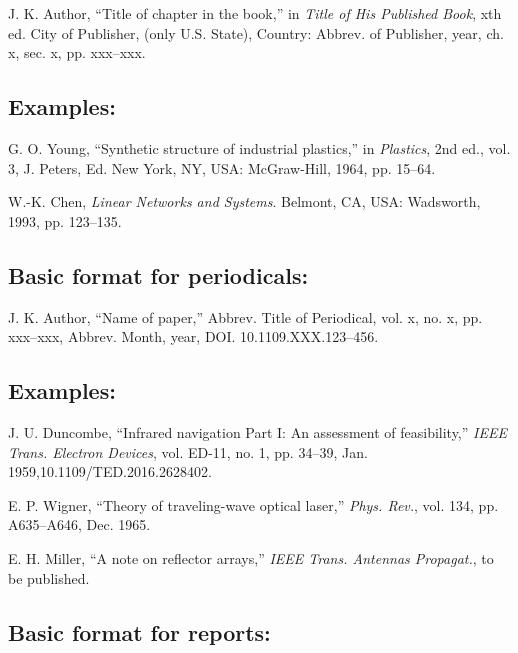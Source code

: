 J. K. Author, ``Title of chapter in the book,'' in {\em Title of His Published Book}, xth ed. City of Publisher, (only U.S. State), Country: Abbrev. of Publisher, year, ch. x, sec. x, pp. xxx--xxx.

\subsection*{Examples:}
\def\refname{}
\begin{thebibliography}{34}

\bibitem{}G. O. Young, ``Synthetic structure of industrial plastics,'' in {\em Plastics}, 2nd ed., vol. 3, J. Peters, Ed. New York, NY, USA: McGraw-Hill, 1964, pp. 15--64.

\bibitem{}W.-K. Chen, {\it Linear Networks and Systems}. Belmont, CA, USA: Wadsworth, 1993, pp. 123--135.

\end{thebibliography}

\subsection*{Basic format for periodicals:}

J. K. Author, ``Name of paper,'' Abbrev. Title of Periodical, vol. x,   no. x, pp. xxx--xxx, Abbrev. Month, year, DOI. 10.1109.XXX.123--456.

\subsection*{Examples:}

\begin{thebibliography}{34}
\setcounter{enumiv}{2}

\bibitem{}J. U. Duncombe, ``Infrared navigation Part I: An assessment of feasibility,'' {\em IEEE Trans. Electron Devices}, vol. ED-11, no. 1, pp. 34--39, Jan. 1959,10.1109/TED.2016.2628402.

\bibitem{}E. P. Wigner, ``Theory of traveling-wave optical laser,''
{\em Phys. Rev.},  vol. 134, pp. A635--A646, Dec. 1965.

\bibitem{}E. H. Miller, ``A note on reflector arrays,'' {\em IEEE Trans. Antennas Propagat.}, to be published.
\end{thebibliography}


\subsection*{Basic format for reports:}

